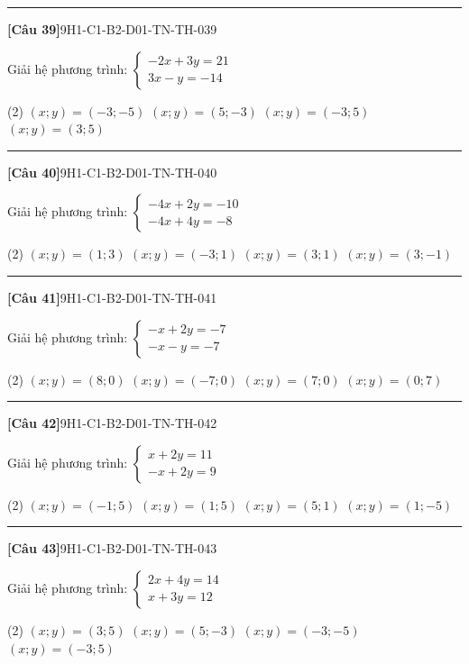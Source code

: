 \documentclass[12pt,a4paper]{article}
\newif\ifloigiai
\newenvironment{cauhoi}[2]{%
  \par\medskip\noindent\rule{\textwidth}{0.4pt}\par\nopagebreak
  \noindent\textbf{[#1]}\hfill{\scriptsize\ttfamily #2}\par\nopagebreak\smallskip}{\par}
\newcommand{\dapan}[1]{\ifloigiai\par\smallskip\noindent\textit{Đáp án:} \textbf{#1}\par\fi}
\begin{document}
\begin{cauhoi}{Câu 39}{9H1-C1-B2-D01-TN-TH-039}
Giải hệ phương trình: $\begin{cases}-2x + 3y=21\\ 3x - y=-14\end{cases}$
\begin{tasks}(2)
\task $(x;y)=(-3;-5)$
\task $(x;y)=(5;-3)$
\task $(x;y)=(-3;5)$
\task $(x;y)=(3;5)$
\end{tasks}
\dapan{C}
\end{cauhoi}
\begin{cauhoi}{Câu 40}{9H1-C1-B2-D01-TN-TH-040}
Giải hệ phương trình: $\begin{cases}-4x + 2y=-10\\ -4x + 4y=-8\end{cases}$
\begin{tasks}(2)
\task $(x;y)=(1;3)$
\task $(x;y)=(-3;1)$
\task $(x;y)=(3;1)$
\task $(x;y)=(3;-1)$
\end{tasks}
\dapan{C}
\end{cauhoi}
\begin{cauhoi}{Câu 41}{9H1-C1-B2-D01-TN-TH-041}
Giải hệ phương trình: $\begin{cases}-x + 2y=-7\\ -x - y=-7\end{cases}$
\begin{tasks}(2)
\task $(x;y)=(8;0)$
\task $(x;y)=(-7;0)$
\task $(x;y)=(7;0)$
\task $(x;y)=(0;7)$
\end{tasks}
\dapan{C}
\end{cauhoi}
\begin{cauhoi}{Câu 42}{9H1-C1-B2-D01-TN-TH-042}
Giải hệ phương trình: $\begin{cases}x + 2y=11\\ -x + 2y=9\end{cases}$
\begin{tasks}(2)
\task $(x;y)=(-1;5)$
\task $(x;y)=(1;5)$
\task $(x;y)=(5;1)$
\task $(x;y)=(1;-5)$
\end{tasks}
\dapan{B}
\end{cauhoi}
\begin{cauhoi}{Câu 43}{9H1-C1-B2-D01-TN-TH-043}
Giải hệ phương trình: $\begin{cases}2x + 4y=14\\ x + 3y=12\end{cases}$
\begin{tasks}(2)
\task $(x;y)=(3;5)$
\task $(x;y)=(5;-3)$
\task $(x;y)=(-3;-5)$
\task $(x;y)=(-3;5)$
\end{tasks}
\dapan{D}
\end{cauhoi}
\end{document}
